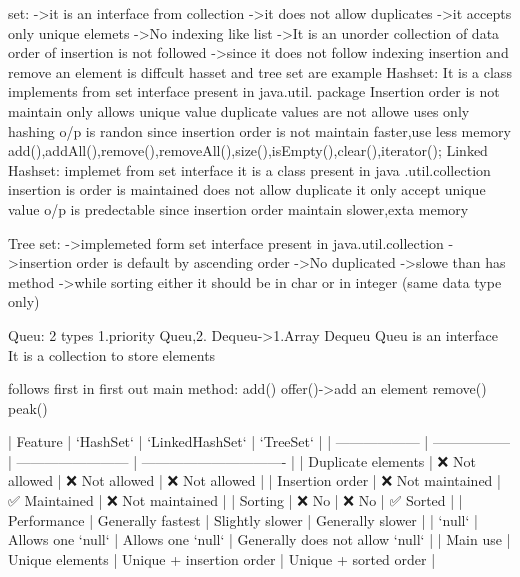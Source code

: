 {{{{{{{{set:
 ->it is an interface from collection
 ->it does not allow duplicates
 ->it accepts only unique elemets
 ->No indexing like list
 ->It is an unorder collection of data order of insertion is not followed
 ->since it does not follow indexing insertion and remove an element is diffcult
 hasset and tree set are example
Hashset:
          It is a class implements from set interface present in java.util. package
          Insertion order is not maintain
          only allows unique value
          duplicate values are not allowe
          uses only hashing
          o/p is randon since insertion order is not maintain
          faster,use less memory
    add(),addAll(),remove(),removeAll(),size(),isEmpty(),clear(),iterator();
Linked Hashset:
          implemet from set interface
          it is a class present in java .util.collection
          insertion is order is maintained
          does not allow duplicate
          it only accept unique value
          o/p is predectable since insertion order maintain
          slower,exta memory

Tree set:
          ->implemeted form set interface present in java.util.collection
          ->insertion order is default by ascending order
          ->No duplicated
          ->slowe than has method
          ->while sorting either it should be in char or in integer (same data type only)

Queu:
2 types 1.priority Queu,2. Dequeu->1.Array Dequeu
          Queu is an interface
          It is a collection to store elements
          
          follows first in first out
          main method:
                    add()
                    offer()->add an element
                    remove()
                    peak()


| Feature            | `HashSet`         | `LinkedHashSet`          | `TreeSet`                         |
| ------------------ | ----------------- | ------------------------ | -------------------------------   |
| Duplicate elements | ❌ Not allowed     | ❌ Not allowed            | ❌ Not allowed                |
| Insertion order    | ❌ Not maintained  | ✅ Maintained             | ❌ Not maintained             |
| Sorting            | ❌ No              | ❌ No                     | ✅ Sorted                     |
| Performance        | Generally fastest | Slightly slower           | Generally slower                |
| `null`             | Allows one `null` | Allows one `null`        | Generally does not allow `null`  |
| Main use           | Unique elements   | Unique + insertion order | Unique + sorted order            |



}}}}}}}}
